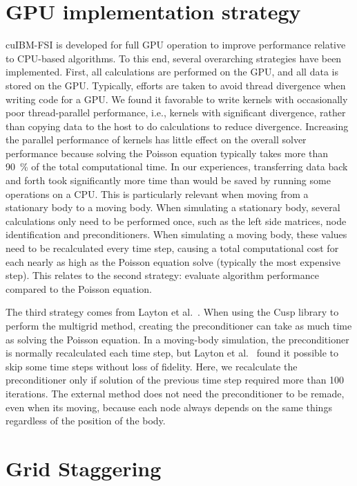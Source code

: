 \section{GPU implementation strategy}
\label{GPU implementation strategy}
cuIBM-FSI is developed for full GPU operation to improve performance relative to CPU-based algorithms. 
To this end, several overarching strategies have been implemented. 
First, all calculations are performed on the GPU, and all data is stored on the GPU.
Typically, efforts are taken to avoid thread divergence when writing code for a GPU. 
We found it favorable to write kernels with occasionally poor thread-parallel performance, i.e., kernels with significant divergence, rather than copying data to the host to do calculations to reduce divergence. 
Increasing the parallel performance of kernels has little effect on the overall solver performance because solving the Poisson equation typically takes more than \SI{90}{\percent} of the total computational time. 
In our experiences, transferring data back and forth took significantly more time than would be saved by running some operations on a CPU. 
This is particularly relevant when moving from a stationary body to a moving body.
When simulating a stationary body, several calculations only need to be performed once, such as the left side matrices, node identification and preconditioners.
When simulating a moving body, these values need to be recalculated every time step, causing a total computational cost for each nearly as high as the Poisson equation solve (typically the most expensive step). 
This relates to the second strategy: evaluate algorithm performance compared to the Poisson equation. 

The third strategy comes from Layton et al.~\cite{layton2011cuibm}.
When using the Cusp library to perform the multigrid method, creating the preconditioner can take as much time as solving the Poisson equation.
In a moving-body simulation, the preconditioner is normally recalculated each time step, but Layton et al.~\cite{layton2011cuibm} found it possible to skip some time steps without loss of fidelity.
Here, we recalculate the preconditioner only if solution of the previous time step required more than 100 iterations. 
The external method does not need the preconditioner to be remade, even when its moving, because each node always depends on the same things regardless of the position of the body. 


\section{Grid Staggering}
\label{Grid Staggering}

